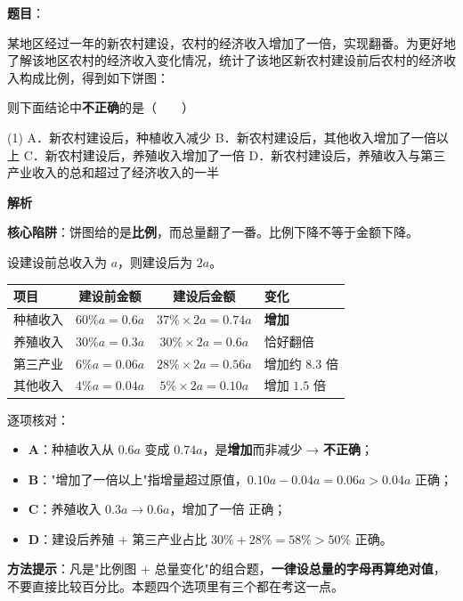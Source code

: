 \begin{answer}

\textbf{题目}：

某地区经过一年的新农村建设，农村的经济收入增加了一倍，实现翻番。为更好地了解该地区农村的经济收入变化情况，统计了该地区新农村建设前后农村的经济收入构成比例，得到如下饼图：
\nopagebreak[4]
\begin{center}\end{center}
\nopagebreak[4]
则下面结论中\textbf{不正确}的是\mbox{（　　）}

\begin{gkopts}(1)
\task A．新农村建设后，种植收入减少
\task B．新农村建设后，其他收入增加了一倍以上
\task C．新农村建设后，养殖收入增加了一倍
\task D．新农村建设后，养殖收入与第三产业收入的总和超过了经济收入的一半
\end{gkopts}

\textbf{解析}

\textbf{核心陷阱}：饼图给的是\textbf{比例}，而总量翻了一番。比例下降不等于金额下降。

设建设前总收入为 $a$，则建设后为 $2a$。

\begin{center}
\begin{tabular}{lccl}
\toprule
项目 & 建设前金额 & 建设后金额 & 变化 \\
\midrule
种植收入 & $60\%a=0.6a$ & $37\%\times2a=0.74a$ & \textbf{增加} \\
养殖收入 & $30\%a=0.3a$ & $30\%\times2a=0.6a$ & 恰好翻倍 \\
第三产业 & $6\%a=0.06a$ & $28\%\times2a=0.56a$ & 增加约 $8.3$ 倍 \\
其他收入 & $4\%a=0.04a$ & $5\%\times2a=0.10a$ & 增加 $1.5$ 倍 \\
\bottomrule
\end{tabular}
\end{center}

逐项核对：

\begin{itemize}
\item \textbf{A}：种植收入从 $0.6a$ 变成 $0.74a$，是\textbf{增加}而非减少 → \textbf{不正确}；
\item \textbf{B}："增加了一倍以上"指增量超过原值，$0.10a-0.04a=0.06a>0.04a$  正确；
\item \textbf{C}：养殖收入 $0.3a\to0.6a$，增加了一倍  正确；
\item \textbf{D}：建设后养殖 $+$ 第三产业占比 $30\%+28\%=58\%>50\%$  正确。
\end{itemize}

\begin{gktip}
\textbf{方法提示}：凡是"比例图 + 总量变化"的组合题，\textbf{一律设总量的字母再算绝对值}，不要直接比较百分比。本题四个选项里有三个都在考这一点。
\end{gktip}


\par\medskip

\end{answer}
